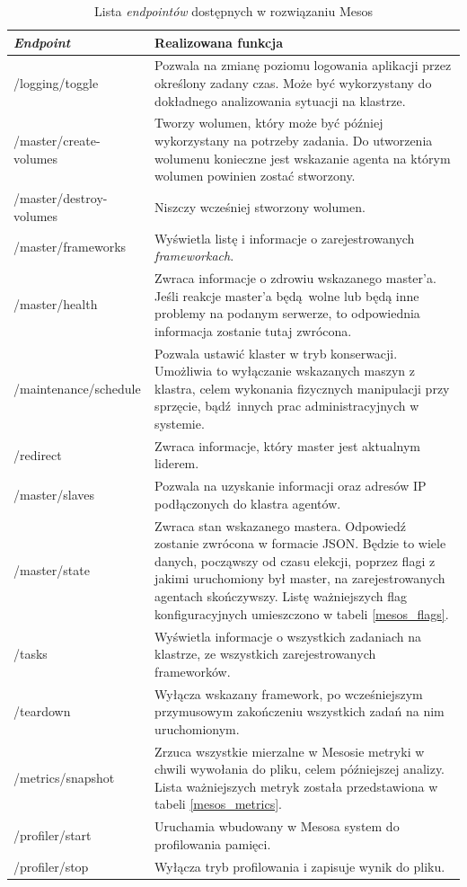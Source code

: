 \documentclass[10pt,a4paper,titlepage,twoside]{report}
\begin{document}
\begin{table}[!htbp]
\caption{Lista \textit{endpointów} dostępnych w rozwiązaniu Mesos}
\label{mesos_endpoints}
\centering
\begin{tabular}{|p{4cm}|p{10cm}|}
  \hline
  \textbf{\textit{Endpoint}} & \textbf{Realizowana funkcja} \\
  \hline
  /logging/toggle & Pozwala na zmianę poziomu logowania aplikacji przez określony zadany czas. Może być wykorzystany do dokładnego analizowania sytuacji na klastrze.\\
  \hline
  /master/create-volumes & Tworzy wolumen, który może być później wykorzystany na potrzeby zadania. Do utworzenia wolumenu konieczne jest wskazanie agenta na którym wolumen powinien zostać stworzony. \\
  \hline
  /master/destroy-volumes & Niszczy wcześniej stworzony wolumen. \\
  \hline
  /master/frameworks & Wyświetla listę i informacje o zarejestrowanych \textit{frameworkach}. \\
  \hline
  /master/health & Zwraca informacje o zdrowiu wskazanego master'a. Jeśli reakcje master'a będą wolne lub będą inne problemy na podanym serwerze, to odpowiednia informacja zostanie tutaj zwrócona. \\
  \hline
  /maintenance/schedule & Pozwala ustawić klaster w tryb konserwacji. Umożliwia to wyłączanie wskazanych maszyn z klastra, celem wykonania fizycznych manipulacji przy sprzęcie, bądź innych prac administracyjnych w systemie. \\
  \hline
  /redirect & Zwraca informacje, który master jest aktualnym liderem. \\
  \hline
  /master/slaves & Pozwala na uzyskanie informacji oraz adresów IP podłączonych do klastra agentów. \\
  \hline
  /master/state & Zwraca stan wskazanego mastera. Odpowiedź zostanie zwrócona w formacie JSON. Będzie to wiele danych, począwszy od czasu elekcji, poprzez flagi z jakimi uruchomiony był master, na zarejestrowanych agentach skończywszy. Listę ważniejszych flag konfiguracyjnych umieszczono w tabeli \ref{mesos_flags}. \\
  \hline
  /tasks & Wyświetla informacje o wszystkich zadaniach na klastrze, ze wszystkich zarejestrowanych frameworków. \\
  \hline
  /teardown & Wyłącza wskazany framework, po wcześniejszym przymusowym zakończeniu wszystkich zadań na nim uruchomionym. \\
  \hline
  /metrics/snapshot & Zrzuca wszystkie mierzalne w Mesosie metryki w chwili wywołania do pliku, celem późniejszej analizy. Lista ważniejszych metryk została przedstawiona w tabeli \ref{mesos_metrics}.\\
  \hline
  /profiler/start & Uruchamia wbudowany w Mesosa system do profilowania pamięci. \\
  \hline
  /profiler/stop & Wyłącza tryb profilowania i zapisuje wynik do pliku. \\
  \hline
\end{tabular}
\end{table}
\end{document}
